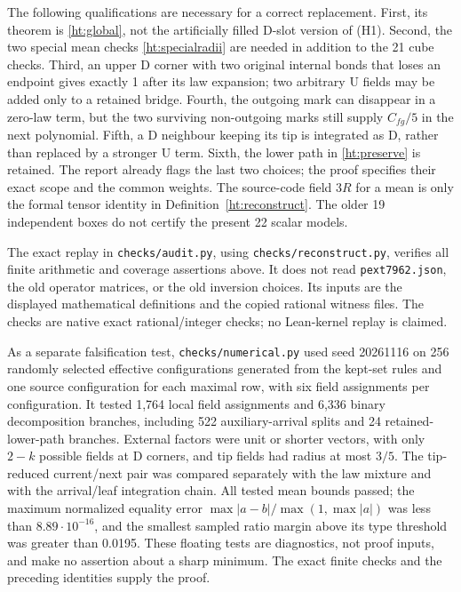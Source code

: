 \begin{htrem}
\label{ht:repairs}
The following qualifications are necessary for a correct replacement.
First, its theorem is \eqref{ht:global}, not the artificially filled
D-slot version of (H1). Second, the two special mean checks
\eqref{ht:specialradii} are needed in addition to the 21 cube checks.
Third, an upper D corner with two original internal bonds that loses
an endpoint gives exactly 1 after its law expansion; two arbitrary U
fields may be added only to a retained bridge. Fourth, the outgoing
mark can disappear in a zero-law term, but the two surviving non-outgoing
marks still supply \(C_{fg}/5\) in the next polynomial. Fifth, a D
neighbour keeping its tip is integrated as D, rather than replaced by
a stronger U term. Sixth, the lower path in \eqref{ht:preserve} is
retained. The report already flags the last two choices; the proof
specifies their exact scope and the common weights. The source-code
field \(3R\) for a mean is only the formal tensor identity in
Definition~\ref{ht:reconstruct}. The older 19 independent boxes do
not certify the present 22 scalar models.

The exact replay in \texttt{checks/audit.py}, using
\texttt{checks/reconstruct.py}, verifies all finite arithmetic and
coverage assertions above. It does not read \texttt{pext7962.json},
the old operator matrices, or the old inversion choices. Its inputs
are the displayed mathematical definitions and the copied rational
witness files. The checks are native exact rational/integer checks;
no Lean-kernel replay is claimed.

As a separate falsification test, \texttt{checks/numerical.py} used
seed 20261116 on 256 randomly selected effective configurations generated
from the kept-set rules and one source configuration for each maximal
row, with six field assignments per configuration. It tested 1,764
local field assignments and 6,336 binary decomposition branches,
including 522 auxiliary-arrival splits and 24 retained-lower-path
branches. External factors were unit or shorter vectors, with only
\(2-k\) possible fields at D corners, and tip fields had radius at
most \(3/5\). The tip-reduced current/next pair was compared separately with
the law mixture and with the arrival/leaf integration chain. All tested
mean bounds passed; the maximum normalized equality error
\(\max|a-b|/\max(1,\max|a|)\) was less than
\(8.89\cdot10^{-16}\), and the smallest sampled ratio margin above
its type threshold was greater than 0.0195. These floating tests are
diagnostics, not proof inputs, and make no assertion about a sharp
minimum. The exact finite checks and the preceding identities supply
the proof.
\end{htrem}
